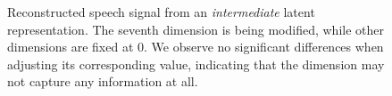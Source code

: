 \begin{figure}
	\centering
	\begin{subfigure}{0.34\textwidth}
		\centering
		
	\end{subfigure}\hfill
	\begin{subfigure}{0.3\textwidth}
		\centering
		
	\end{subfigure}\hfill
	\begin{subfigure}{0.3\textwidth}
		\centering
		
	\end{subfigure}
	
	\vspace{0.5cm} %
	
	\begin{subfigure}{0.36\textwidth}
		\centering
		
	\end{subfigure}\hfill
	\begin{subfigure}{0.3\textwidth}
		\centering
		
	\end{subfigure}\hfill
	\begin{subfigure}{0.3\textwidth}
		\centering
		
	\end{subfigure}
	
	\caption{Reconstructed speech signal from an \textit{intermediate} latent representation. The seventh dimension is being modified, while other dimensions are fixed at 0. We observe no significant differences when adjusting its corresponding value, indicating that the dimension may not capture any information at all.}
	\label{fig:interpol_dim7}
\end{figure}


